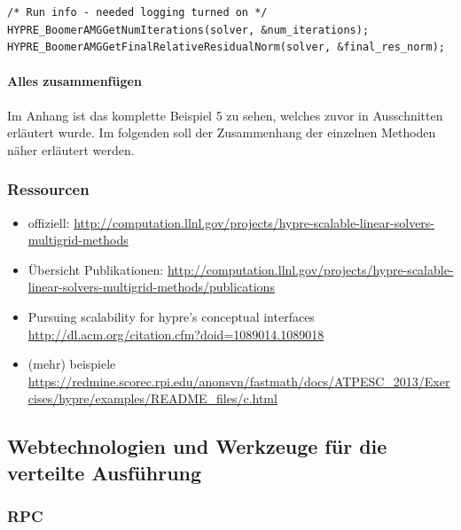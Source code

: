\documentclass[a4paper,10pt]{article}
\begin{document}
\begin{lstlisting}[frame=single,caption=HYPRE Nutzung: Solver mit Preconditioner]
/* Run info - needed logging turned on */
HYPRE_BoomerAMGGetNumIterations(solver, &num_iterations);
HYPRE_BoomerAMGGetFinalRelativeResidualNorm(solver, &final_res_norm);
\end{lstlisting}

\paragraph{Alles zusammenfügen}

Im Anhang ist das komplette Beispiel 5 zu sehen, welches zuvor in Ausschnitten erläutert wurde.
Im folgenden soll der Zusammenhang der einzelnen Methoden näher erläutert werden.
\cite{hypreReferenceManual}

\subsubsection{Ressourcen}

\begin{itemize}
 \item offiziell: \url{http://computation.llnl.gov/projects/hypre-scalable-linear-solvers-multigrid-methods}
 \item Übersicht Publikationen: \url{http://computation.llnl.gov/projects/hypre-scalable-linear-solvers-multigrid-methods/publications}
 \item Pursuing scalability for hypre's conceptual interfaces \url{http://dl.acm.org/citation.cfm?doid=1089014.1089018}
 \item (mehr) beispiele \url{https://redmine.scorec.rpi.edu/anonsvn/fastmath/docs/ATPESC_2013/Exercises/hypre/examples/README_files/c.html}
\end{itemize}

\subsection{Webtechnologien und Werkzeuge für die verteilte Ausführung}

\subsubsection{RPC}
\end{document}

